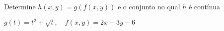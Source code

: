 Determine $h(x,y) = g(f(x,y))$ e o conjunto no qual $h$ é contínua

\item $g(t)=t^2 + \sqrt t, \quad f(x,y)=2x+3y-6$